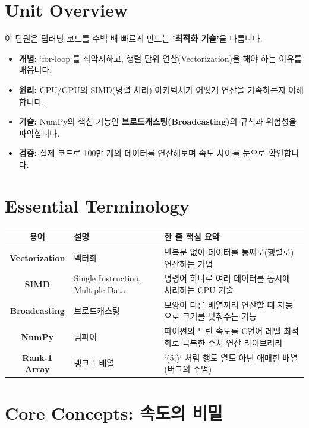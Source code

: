 \documentclass[11pt,a4paper]{book}
\theoremstyle{definition}
\begin{document}
\section{Unit Overview}
\begin{summarybox}[title={핵심 목표}]
이 단원은 딥러닝 코드를 수백 배 빠르게 만드는 \textbf{'최적화 기술'}을 다룹니다.
\begin{itemize}
    \item \textbf{개념:} `for-loop`를 죄악시하고, 행렬 단위 연산(Vectorization)을 해야 하는 이유를 배웁니다.
    \item \textbf{원리:} CPU/GPU의 SIMD(병렬 처리) 아키텍처가 어떻게 연산을 가속하는지 이해합니다.
    \item \textbf{기술:} NumPy의 핵심 기능인 \textbf{브로드캐스팅(Broadcasting)}의 규칙과 위험성을 파악합니다.
    \item \textbf{검증:} 실제 코드로 100만 개의 데이터를 연산해보며 속도 차이를 눈으로 확인합니다.
\end{itemize}
\end{summarybox}

\section{Essential Terminology}
\begin{center}
\begin{tabular}{|c|l|l|}
\hline
\textbf{용어} & \textbf{설명} & \textbf{한 줄 핵심 요약} \\ \hline
\textbf{Vectorization} & 벡터화 & 반복문 없이 데이터를 통째로(행렬로) 연산하는 기법 \\ \hline
\textbf{SIMD} & Single Instruction, Multiple Data & 명령어 하나로 여러 데이터를 동시에 처리하는 CPU 기술 \\ \hline
\textbf{Broadcasting} & 브로드캐스팅 & 모양이 다른 배열끼리 연산할 때 자동으로 크기를 맞춰주는 기능 \\ \hline
\textbf{NumPy} & 넘파이 & 파이썬의 느린 속도를 C언어 레벨 최적화로 극복한 수치 연산 라이브러리 \\ \hline
\textbf{Rank-1 Array} & 랭크-1 배열 & `(5,)` 처럼 행도 열도 아닌 애매한 배열 (버그의 주범) \\ \hline
\end{tabular}
\end{center}

\section{Core Concepts: 속도의 비밀}
\end{document}

